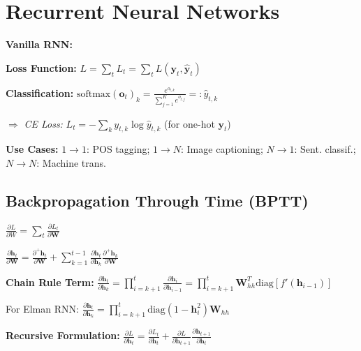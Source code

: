 \section{Recurrent Neural Networks}


\textbf{Vanilla RNN:} 

\textbf{Loss Function:} $L = \sum_t L_t = \sum_t L(\mathbf{y}_t, \hat{\mathbf{y}}_t)$

\textbf{Classification:}
$\text{softmax}(\mathbf{o}_t)_k = \frac{e^{o_{t,k}}}{\sum_{j=1}^K e^{o_{t,j}}} =: \hat{y}_{t,k}$ 

$\Rightarrow$ \textit{CE Loss:} $L_t = -\sum_k y_{t,k} \log \hat{y}_{t,k}$ (for one-hot $\mathbf{y}_t$)

\textbf{Use Cases:} {\small $1 \to 1$: POS tagging; $1 \to N$: Image captioning; $N \to 1$: Sent. classif.; $N \to N$: Machine trans.}


\subsection{Backpropagation Through Time (BPTT)}
{\small
$\frac{\partial L}{\partial W} = \sum_t \frac{\partial L_t}{\partial \mathbf{W}} \quad$ 

$\frac{\partial \mathbf{h}_t}{\partial \mathbf{W}} = \frac{\partial^+ \mathbf{h}_t}{\partial \mathbf{W}} + \sum_{k=1}^{t-1} \frac{\partial \mathbf{h}_t}{\partial \mathbf{h}_k} \frac{\partial^+ \mathbf{h}_k}{\partial \mathbf{W}}$

\textbf{Chain Rule Term:} $\frac{\partial \mathbf{h}_t}{\partial \mathbf{h}_k} = \prod_{i=k+1}^t \frac{\partial \mathbf{h}_i}{\partial \mathbf{h}_{i-1}} = \prod_{i=k+1}^t \mathbf{W}_{hh}^T \text{diag}[f'(\mathbf{h}_{i-1})]$

For Elman RNN: $\frac{\partial \mathbf{h}_t}{\partial \mathbf{h}_k} = \prod_{i=k+1}^t \text{diag}(1 - \mathbf{h}_i^2) \mathbf{W}_{hh}$

\textbf{Recursive Formulation:}
$\frac{\partial L}{\partial \mathbf{h}_t} = \frac{\partial L_t}{\partial \mathbf{h}_t} + \frac{\partial L}{\partial \mathbf{h}_{t+1}} \frac{\partial \mathbf{h}_{t+1}}{\partial \mathbf{h}_t}$}

